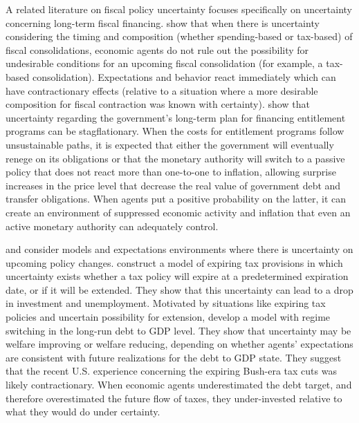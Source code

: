 \documentclass[11pt]{article}
\newcommand{\citee}[1]{\citet{#1}}
\begin{document}
A related literature on fiscal policy uncertainty focuses specifically on uncertainty concerning long-term fiscal financing.  \citee{leeper_ej} show that when there is uncertainty considering the timing and composition (whether spending-based or tax-based) of fiscal consolidations, economic agents do not rule out the possibility for undesirable conditions for an upcoming fiscal consolidation (for example, a tax-based consolidation).  Expectations and behavior react immediately which can have contractionary effects (relative to a situation where a more desirable composition for fiscal contraction was known with certainty).  \citee{davig_leeper_walker} show that uncertainty regarding the government's long-term plan for financing entitlement programs can be stagflationary.  When the costs for entitlement programs follow unsustainable paths, it is expected that either the government will eventually renege on its obligations or that the monetary authority will switch to a passive policy that does not react more than one-to-one to inflation, allowing surprise increases in the price level that decrease the real value of government debt and transfer obligations.  When agents put a positive probability on the latter, it can create an environment of suppressed economic activity and inflation that even an active monetary authority can adequately control.

\citee{richter2013} and \citee{davig2013} consider models and expectations environments where there is uncertainty on upcoming policy changes.  \citee{davig2013} construct a model of expiring tax provisions in which uncertainty exists whether a tax policy will expire at a predetermined expiration date, or if it will be extended.  They show that this uncertainty can lead to a drop in investment and unemployment.  Motivated by situations like expiring tax policies and uncertain possibility for extension, \citee{richter2013} develop a model with regime switching in the long-run debt to GDP level.  They show that uncertainty may be welfare improving or welfare reducing, depending on whether agents' expectations are consistent with future realizations for the debt to GDP state.  They suggest that the recent U.S. experience concerning the expiring Bush-era tax cuts was likely contractionary.  When economic agents underestimated the debt target, and therefore overestimated the future flow of taxes, they under-invested relative to what they would do under certainty.  
\end{document}
